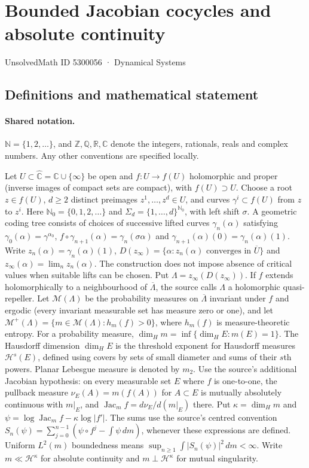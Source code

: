 \documentclass[11pt]{article}
\begin{document}
\setcounter{section}{5300055}
\section{Bounded Jacobian cocycles and absolute continuity}\label{5300056}
{\small\sffamily UnsolvedMath ID 5300056 · Dynamical Systems}
\subsection{Definitions and mathematical statement}

\paragraph{Shared notation.}$\mathbb N=\{1,2,\ldots\}$, and $\mathbb Z,\mathbb Q,\mathbb R,\mathbb C$ denote the integers, rationals, reals and complex numbers. Any other conventions are specified locally.


Let $U\subset\widehat{\mathbb C}=\mathbb C\cup\{\infty\}$ be open and $f:U\to f(U)$ holomorphic and proper (inverse images of compact sets are compact), with $f(U)\supset U$. Choose a root $z\in f(U)$, $d\geq2$ distinct preimages $z^1,\ldots,z^d\in U$, and curves $\gamma^i\subset f(U)$ from $z$ to $z^i$. Here $\mathbb N_0=\{0,1,2,\ldots\}$ and $\Sigma_d=\{1,\ldots,d\}^{\mathbb N_0}$, with left shift $\sigma$. A geometric coding tree consists of choices of successive lifted curves $\gamma_n(\alpha)$ satisfying $\gamma_0(\alpha)=\gamma^{\alpha_0}$, $f\circ\gamma_{n+1}(\alpha)=\gamma_n(\sigma\alpha)$ and $\gamma_{n+1}(\alpha)(0)=\gamma_n(\alpha)(1)$. Write $z_n(\alpha)=\gamma_n(\alpha)(1)$, $D(z_\infty)=\{\alpha:z_n(\alpha)\text{ converges in }\overline U\}$ and $z_\infty(\alpha)=\lim_n z_n(\alpha)$. The construction does not impose absence of critical values when suitable lifts can be chosen. Put $\Lambda=z_\infty(D(z_\infty))$. If $f$ extends holomorphically to a neighbourhood of $\overline\Lambda$, the source calls $\Lambda$ a holomorphic quasi-repeller. Let $\mathcal M(\Lambda)$ be the probability measures on $\overline\Lambda$ invariant under $f$ and ergodic (every invariant measurable set has measure zero or one), and let $\mathcal M^+(\Lambda)=\{m\in\mathcal M(\Lambda):h_m(f)>0\}$, where $h_m(f)$ is measure-theoretic entropy. For a probability measure, $\dim_Hm=\inf\{\dim_HE:m(E)=1\}$. The Hausdorff dimension $\dim_H E$ is the threshold exponent for Hausdorff measures $\mathcal H^s(E)$, defined using covers by sets of small diameter and sums of their $s$th powers. Planar Lebesgue measure is denoted by $m_2$. Use the source's additional Jacobian hypothesis: on every measurable set $E$ where $f$ is one-to-one, the pullback measure $\nu_E(A)=m(f(A))$ for $A\subset E$ is mutually absolutely continuous with $m|_E$, and $\operatorname{Jac}_m f=d\nu_E/d(m|_E)$ there. Put $\kappa=\dim_Hm$ and $\psi=\log\operatorname{Jac}_mf-\kappa\log|f'|$. The sums use the source's centred convention $S_n(\psi)=\sum_{j=0}^{n-1}(\psi\circ f^j-\int\psi\,dm)$, whenever these expressions are defined. Uniform $L^2(m)$ boundedness means $\sup_{n\geq1}\int|S_n(\psi)|^2\,dm<\infty$. Write $m\ll\mathcal H^\kappa$ for absolute continuity and $m\perp\mathcal H^\kappa$ for mutual singularity.
\end{document}
